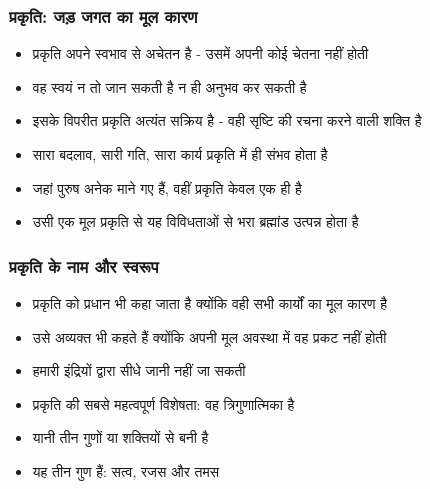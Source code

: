 \begin{frame}[fragile]\frametitle{प्रकृति: जड़ जगत का मूल कारण}
      \begin{itemize}
	\item प्रकृति अपने स्वभाव से अचेतन है - उसमें अपनी कोई चेतना नहीं होती
	\item वह स्वयं न तो जान सकती है न ही अनुभव कर सकती है
	\item इसके विपरीत प्रकृति अत्यंत सक्रिय है - वही सृष्टि की रचना करने वाली शक्ति है
	\item सारा बदलाव, सारी गति, सारा कार्य प्रकृति में ही संभव होता है
	\item जहां पुरुष अनेक माने गए हैं, वहीं प्रकृति केवल एक ही है
	\item उसी एक मूल प्रकृति से यह विविधताओं से भरा ब्रह्मांड उत्पन्न होता है
	  \end{itemize}
\end{frame}

\begin{frame}[fragile]\frametitle{प्रकृति के नाम और स्वरूप}
      \begin{itemize}
	\item प्रकृति को प्रधान भी कहा जाता है क्योंकि वही सभी कार्यों का मूल कारण है
	\item उसे अव्यक्त भी कहते हैं क्योंकि अपनी मूल अवस्था में वह प्रकट नहीं होती
	\item हमारी इंद्रियों द्वारा सीधे जानी नहीं जा सकती
	\item प्रकृति की सबसे महत्वपूर्ण विशेषता: वह त्रिगुणात्मिका है
	\item यानी तीन गुणों या शक्तियों से बनी है
	\item यह तीन गुण हैं: सत्व, रजस और तमस
	  \end{itemize}
\end{frame}


